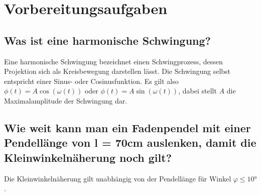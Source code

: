 \section{Vorbereitungsaufgaben}
\subsection{Was ist eine harmonische Schwingung?}
Eine harmonische Schwingung bezeichnet einen Schwingprozess, dessen Projektion sich als Kreisbewegung darstellen lässt. Die Schwingung selbst entspricht einer Sinus- oder Cosinusfunktion.
Es gilt also $\phi(t)=A\cos(\omega(t))$ oder $\phi(t)= A\sin(\omega(t))$, dabei stellt $A$ die Maximalamplitude der Schwingung dar.

\subsection{Wie weit kann man ein Fadenpendel mit einer Pendellänge von l = 70cm auslenken, damit die Kleinwinkelnäherung noch gilt?}
Die Kleinwinkelnäherung gilt unabhängig von der Pendellänge für Winkel $φ\leq10°$.
\label{sec:Vorbereitungsaufgaben}

